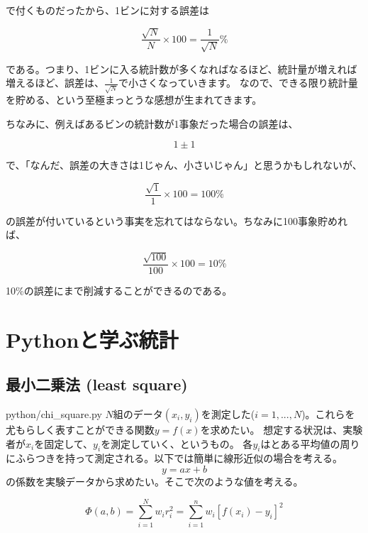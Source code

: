 \documentclass[a4paper,uplatex]{jsreport}
\begin{document}
で付くものだったから、1ビンに対する誤差は

\begin{equation}
  \frac{\sqrt{N}}{N}\times 100 = \frac{1}{\sqrt{N}} \%
\end{equation}

である。つまり、1ビンに入る統計数が多くなればなるほど、統計量が増えれば増えるほど、誤差は、$\frac{1}{\sqrt{N}}$で小さくなっていきます。
なので、できる限り統計量を貯める、という至極まっとうな感想が生まれてきます。

ちなみに、例えばあるビンの統計数が1事象だった場合の誤差は、

\begin{equation}
  1\pm 1
\end{equation}

で、「なんだ、誤差の大きさは1じゃん、小さいじゃん」と思うかもしれないが、

\begin{equation}
  \frac{\sqrt{1}}{1}\times 100 = 100 \%
\end{equation}

の誤差が付いているという事実を忘れてはならない。ちなみに100事象貯めれば、

\begin{equation}
  \frac{\sqrt{100}}{100}\times 100 = 10 \%
\end{equation}

10\%の誤差にまで削減することができるのである。



\chapter{Pythonと学ぶ統計}
\section{最小二乗法 (least square)}
python/chi\_square.py
$N$組のデータ$(x_i,y_i)$を測定した($i=1,...,N$)。これらを尤もらしく表すことができる関数$y=f(x)$を求めたい。
想定する状況は、実験者が$x_i$を固定して、$y_i$を測定していく、というもの。
各$y_i$はとある平均値の周りにふらつきを持って測定される。以下では簡単に線形近似の場合を考える。
\begin{equation}
  y = ax + b
\end{equation}
の係数を実験データから求めたい。そこで次のような値を考える。

\begin{equation}
  \Phi(a,b) = \sum_{i=1}^{N} w_i r_i^{2} = \sum_{i=1}^{n} w_i[f(x_i)-y_i]^2
\end{equation}
\end{document}
